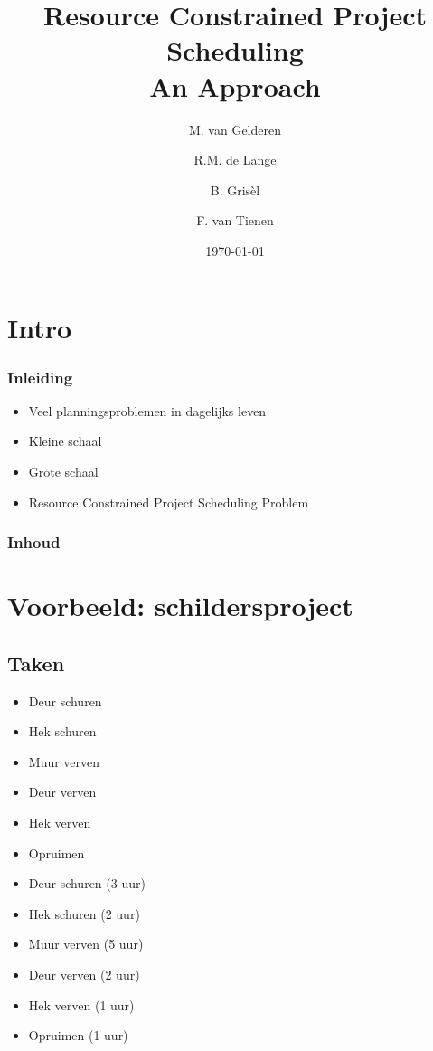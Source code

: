 \documentclass{beamer}
\title[RCPS]{Resource Constrained Project Scheduling\\
An Approach}
\author{M. van Gelderen  \and
    R.M. de Lange \and
    B. Gris\`el \and
    F. van Tienen}
\institute{TU Delft}
\date{\today}
\theoremstyle{definition}
\begin{document}
\begin{frame}
\titlepage
\end{frame}

\section*{Intro}
\begin{frame}
    \frametitle{Inleiding}
    \begin{itemize}
	\item Veel planningsproblemen in dagelijks leven
        \item Kleine schaal
        \item Grote schaal
	\item Resource Constrained Project Scheduling Problem
    \end{itemize}
\end{frame}

\begin{frame}
    \frametitle{Inhoud}
    \tableofcontents
\end{frame}

\section[Schildersproject]{Voorbeeld: schildersproject}

\subsection{Taken}

\begin{frame}
	\begin{itemize}
		\item Deur schuren
		\item Hek schuren
		\item<2-> Muur verven
		\item<2-> Deur verven
		\item<2-> Hek verven
		\item<3-> Opruimen
	\end{itemize}
\end{frame}

\begin{frame}
	\begin{itemize}
		\item Deur schuren (3 uur)
		\item Hek schuren (2 uur)
		\item<2-> Muur verven (5 uur)
		\item<2-> Deur verven (2 uur)
		\item<2-> Hek verven (1 uur)
		\item<3-> Opruimen (1 uur)
	\end{itemize}
\end{frame}
\end{document}
